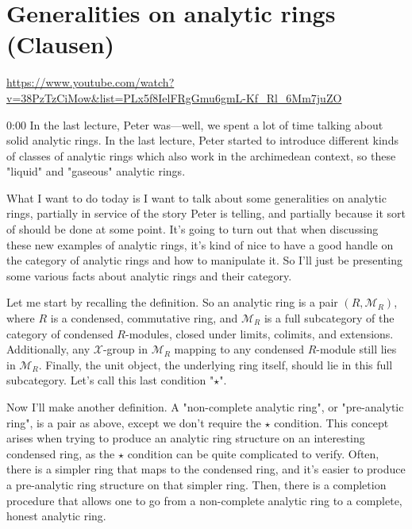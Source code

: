 
\section{\ufs Generalities on analytic rings (Clausen)}

\url{https://www.youtube.com/watch?v=38PzTzCiMow&list=PLx5f8IelFRgGmu6gmL-Kf_Rl_6Mm7juZO}
\renewcommand{\yt}[2]{\href{https://www.youtube.com/watch?v=38PzTzCiMow&list=PLx5f8IelFRgGmu6gmL-Kf_Rl_6Mm7juZO&t=#1}{#2}}
\vspace{1em}

\begin{unfinished}{0:00}
In the last lecture, Peter was---well, we spent a lot of time talking about solid analytic rings. In the last lecture, Peter started to introduce different kinds of classes of analytic rings which also work in the archimedean context, so these "liquid" and "gaseous" analytic rings.

What I want to do today is I want to talk about some generalities on analytic rings, partially in service of the story Peter is telling, and partially because it sort of should be done at some point. It's going to turn out that when discussing these new examples of analytic rings, it's kind of nice to have a good handle on the category of analytic rings and how to manipulate it. So I'll just be presenting some various facts about analytic rings and their category.

Let me start by recalling the definition. So an analytic ring is a pair $(R, \mathcal{M}_R)$, where $R$ is a condensed, commutative ring, and $\mathcal{M}_R$ is a full subcategory of the category of condensed $R$-modules, closed under limits, colimits, and extensions. Additionally, any $\mathcal{X}$-group in $\mathcal{M}_R$ mapping to any condensed $R$-module still lies in $\mathcal{M}_R$. Finally, the unit object, the underlying ring itself, should lie in this full subcategory. Let's call this last condition "$\star$".

Now I'll make another definition. A "non-complete analytic ring", or "pre-analytic ring", is a pair as above, except we don't require the $\star$ condition. This concept arises when trying to produce an analytic ring structure on an interesting condensed ring, as the $\star$ condition can be quite complicated to verify. Often, there is a simpler ring that maps to the condensed ring, and it's easier to produce a pre-analytic ring structure on that simpler ring. Then, there is a completion procedure that allows one to go from a non-complete analytic ring to a complete, honest analytic ring.


\end{unfinished}
